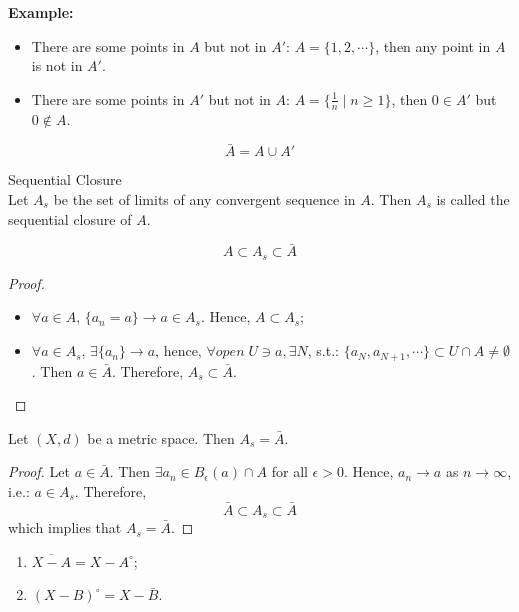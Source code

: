 \noindent\textbf{Example:}
\begin{itemize}
    \item There are some points in $A$ but not in $A'$: $A=\{1,2,\cdots\}$, then any point in $A$ is not in $A'$.
    \item There are some points in $A'$ but not in $A$: $A=\{\frac{1}{n} \mid n\geq 1\}$, then $0 \in A'$ but $0 \notin A$.
\end{itemize}

\begin{proposition}
    $$\bar{A}= A \cup A'$$
\end{proposition}

\begin{definition}{Sequential Closure}\\
Let $A_s$ be the set of limits of any convergent sequence in $A$. Then $A_s$ is called the sequential closure of $A$.
\end{definition}

\begin{lemma}
    $$A\subset A_s\subset \bar{A}$$
\end{lemma}

\begin{proof}
\begin{itemize}
    \item $\forall a \in A$, $\{a_n=a\}\rightarrow a \in A_s$. Hence, $A\subset A_s$;
    \item $\forall a \in A_s$, $\exists \{a_n\}\rightarrow a$, hence, $\forall open \; U\ni a, \exists N$, s.t.: $\{a_N,a_{N+1}, \cdots\} \subset U\cap A\neq \emptyset$. Then $a \in \bar{A}$. Therefore, $A_s \subset \bar{A}$.
\end{itemize}
\end{proof}

\begin{proposition}
    Let $(X,d)$ be a metric space. Then $A_s=\bar{A}$.
\end{proposition}

\begin{proof}
    Let $a \in \bar{A}$. Then $\exists a_n \in B_\epsilon(a) \cap A$ for all $\epsilon >0$. Hence, $a_n \rightarrow a$ as $n \rightarrow \infty$, i.e.: $a \in A_s$. Therefore, $$\bar{A} \subset A_s \subset \bar{A}$$
    which implies that $A_s=\bar{A}$.
\end{proof}

\begin{proposition}
    \begin{enumerate}
        \item $\overline{X-A} = X-A^\circ$;
        \item $(X-B)^\circ = X-\bar{B}$.
    \end{enumerate}
\end{proposition}

